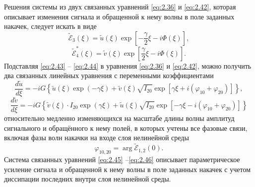 Решения системы из двух связанных уравнений \eqref{eq:2.36} и \eqref{eq:2.42}, которая описывает изменения сигнала и обращенной к нему волны в поле заданных накачек, следует искать в виде
\begin{equation}
	\label{eq:2.43}
	\tilde{\mathcal{E}}_{3}(\xi)=\tilde{u}(\xi) \exp \left[-\frac{\gamma}{2} \xi-i \Phi(\xi)\right],
\end{equation}
\begin{equation}
	\label{eq:2.44}
	\tilde{\mathcal{E}}_{4}^*(\xi)=\tilde{v}(\xi) \exp \left[\frac{\gamma}{2} \xi-i \Phi(\xi)\right].
\end{equation}
Подставляя \eqref{eq:2.43} -- \eqref{eq:2.44} в уравнения \eqref{eq:2.36} и \eqref{eq:2.42}, можно получить два связанных
линейных уравнения с переменными коэффициентами
\begin{equation}
	\label{eq:2.45}
	\frac{d \tilde{u}}{d \xi}=-i G\left\{\tilde{u}(\xi) \exp (-\gamma \xi)+\tilde{v}(\xi) \sqrt{I_{20}} \exp \left[\gamma \xi+i\left(\varphi_{10}+\varphi_{20}\right)\right]\right\},
\end{equation}
\begin{equation}
	\label{eq:2.46}
	\frac{d \tilde{v}}{d \xi}=-i G\left\{\tilde{v}(\xi) \cdot I_{20} \exp (\gamma \xi)+\tilde{u}(\xi) \sqrt{I_{20}} \exp \left[-\gamma \xi-i\left(\varphi_{10}+\varphi_{20}\right)\right]\right\}
\end{equation}
относительно медленно изменяющихся на масштабе длины волны амплитуд
сигнального и обращённого к нему полей, в которых учтены все фазовые связи,
включая фазы волн накачки на входе слоя нелинейной среды
\begin{equation}
	\label{eq:2.47}
	\varphi_{10,20}	= \operatorname{arg} \tilde{\mathcal{E}}_{1,2}(0).
\end{equation}
Система связанных уравнений \eqref{eq:2.45} --\eqref{eq:2.46} описывает параметрическое усиление
сигнала и обращенной к нему волны в поле заданных накачек с учетом диссипации последних внутри слоя нелинейной среды.

